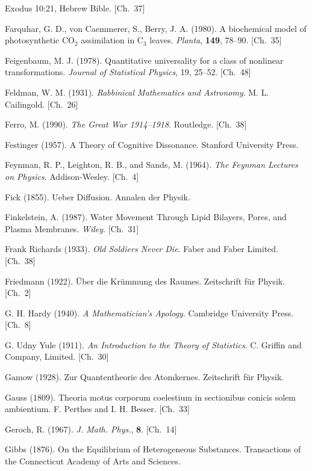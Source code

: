 \begin{list}{}{%
  \setlength{\leftmargin}{2em}%
  \setlength{\itemindent}{-2em}%
  \setlength{\itemsep}{0.35\baselineskip}%
  \setlength{\parsep}{0pt}%
  \setlength{\topsep}{0.5em}}
\item Exodus 10:21, Hebrew Bible. \hfill {\scriptsize [Ch.~37]}
\item Farquhar, G. D., von Caemmerer, S., Berry, J. A. (1980). A biochemical model of photosynthetic $\mathrm{CO}_2$ assimilation in C$_3$ leaves. \textit{Planta}, \textbf{149}, 78–90. \hfill {\scriptsize [Ch.~35]}
\item Feigenbaum, M. J. (1978). Quantitative universality for a class of nonlinear transformations. \textit{Journal of Statistical Physics}, 19, 25–52. \hfill {\scriptsize [Ch.~48]}
\item Feldman, W. M. (1931). \textit{Rabbinical Mathematics and Astronomy}. M. L. Cailingold. \hfill {\scriptsize [Ch.~26]}
\item Ferro, M. (1990). \textit{The Great War 1914–1918}. Routledge. \hfill {\scriptsize [Ch.~38]}
\item Festinger (1957). A Theory of Cognitive Dissonance. Stanford University Press.
\item Feynman, R. P., Leighton, R. B., and Sands, M. (1964). \textit{The Feynman Lectures on Physics}. Addison-Wesley. \hfill {\scriptsize [Ch.~4]}
\item Fick (1855). Ueber Diffusion. Annalen der Physik.
\item Finkelstein, A. (1987). Water Movement Through Lipid Bilayers, Pores, and Plasma Membranes. \textit{Wiley}. \hfill {\scriptsize [Ch.~31]}
\item Frank Richards (1933). \textit{Old Soldiers Never Die}. Faber and Faber Limited. \hfill {\scriptsize [Ch.~38]}
\item Friedmann (1922). Über die Krümmung des Raumes. Zeitschrift für Physik. \hfill {\scriptsize [Ch.~2]}
\item G. H. Hardy (1940). \textit{A Mathematician's Apology}. Cambridge University Press. \hfill {\scriptsize [Ch.~8]}
\item G. Udny Yule (1911). \textit{An Introduction to the Theory of Statistics}. C. Griffin and Company, Limited. \hfill {\scriptsize [Ch.~30]}
\item Gamow (1928). Zur Quantentheorie des Atomkernes. Zeitschrift für Physik.
\item Gauss (1809). Theoria motus corporum coelestium in sectionibus conicis solem ambientium. F. Perthes and I. H. Besser. \hfill {\scriptsize [Ch.~33]}
\item Geroch, R. (1967). \textit{J. Math. Phys.}, \textbf{8}. \hfill {\scriptsize [Ch.~14]}
\item Gibbs (1876). On the Equilibrium of Heterogeneous Substances. Transactions of the Connecticut Academy of Arts and Sciences.

\end{list}
